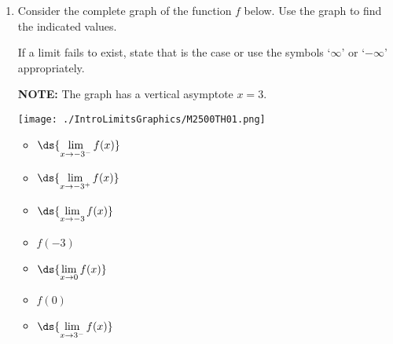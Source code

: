 \documentclass{ximera}
\begin{document}
	\author{Stitz-Zeager}


\label{ExercisesforIntroLimits}

\begin{enumerate}

\item  Consider the complete graph of the function $f$ below.  Use the graph to find the indicated values.

\smallskip

If a limit fails to exist, state that is the case  or use the symbols `$\infty$' or `$-\infty$' appropriately.
 
 \smallskip
 
 \textbf{NOTE:}  The graph has a vertical asymptote $x=3$.  

\begin{center}

\texttt{[image: ./IntroLimitsGraphics/M2500TH01.png]}

\end{center}

\bigskip

\begin{multicols}{4}

\begin{itemize}

\item $\ds{\lim_{x \rightarrow -3^{-}} f(x)}$

\item $\ds{\lim_{x \rightarrow -3^{+}} f(x)}$

\item $\ds{\lim_{x \rightarrow -3} f(x)}$

\item $f(-3)$

\end{itemize}

\end{multicols}

\bigskip

\begin{multicols}{4}

\begin{itemize}

\item $\ds{\lim_{x \rightarrow 0} f(x)}$

\item  $f(0)$

\item $\ds{\lim_{x \rightarrow 3^{-}} f(x)}$


\end{itemize}
\end{multicols}
\end{enumerate}
\end{document}
